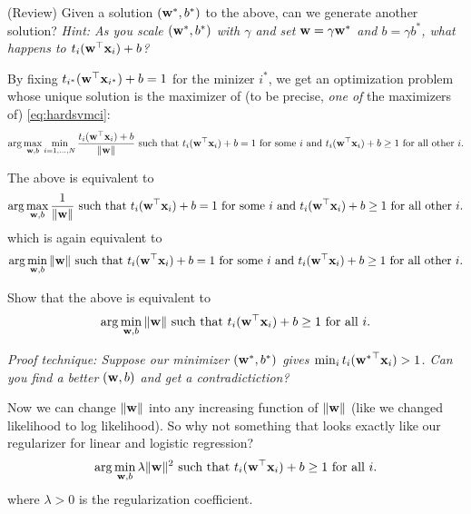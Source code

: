 \documentclass{discussion}
\begin{document}
\begin{exercise}(Review) Given a solution $(\mathbf{w}^*,b^*)$ to the above, can we generate another solution? 
\emph{Hint: As you scale $(\mathbf{w}^*,b^*)$ with $\gamma$ and set $\mathbf{w} = \gamma\mathbf{w}^*$ and $b = \gamma b^*$, what happens to $t_i (\mathbf{w}^\top \mathbf{x}_i) + b$?}
\end{exercise}

By fixing $t_{i^*} (\mathbf{w}^\top \mathbf{x}_{i^*}) + b = 1$ for the minizer $i^*$, we get an optimization problem whose unique solution is the maximizer of (to be precise, \emph{one of} the maximizers of) \eqref{eq:hardsvmci}:
\begin{equation}
    \arg\max_{\mathbf{w}, b} \min_{i = 1,\ldots, N} \frac{t_{i} (\mathbf{w}^\top \mathbf{x}_{i}) + b}{\|\mathbf{w}\|}  \ \text{such that $t_{i} (\mathbf{w}^\top \mathbf{x}_{i}) + b = 1$ for some $i$ and $t_{i} (\mathbf{w}^\top \mathbf{x}_{i}) + b \geq 1$ for all other $i$.}
\end{equation}

The above is equivalent to 
\begin{equation}
    \arg\max_{\mathbf{w}, b} \frac{1}{\|\mathbf{w}\|}  \ \text{such that $t_{i} (\mathbf{w}^\top \mathbf{x}_{i}) + b = 1$ for some $i$ and $t_{i} (\mathbf{w}^\top \mathbf{x}_{i}) + b \geq 1$ for all other $i$.}
\end{equation}
which is again equivalent to 
\begin{equation}
    \arg\min_{\mathbf{w}, b} \|\mathbf{w}\|  \ \text{such that $\ci = 1$ for some $i$ and $\ci \geq 1$ for all other $i$.}
\end{equation}

\begin{exercise}
Show that the above is equivalent to
\begin{equation}
\label{eq:hardsvm_primal}
    \arg\min_{\mathbf{w}, b} \|\mathbf{w}\|  \ \text{such that $t_{i} (\mathbf{w}^\top \mathbf{x}_{i}) + b \geq 1$ for all $i$.}
\end{equation}

\emph{Proof technique: Suppose our minimizer $(\mathbf{w}^*, b^*)$ gives $\min_i t_i({\mathbf{w}^*}^\top \mathbf{x}_i) > 1$. Can you find a better $(\mathbf{w}, b)$ and get a contradictiction?}
\end{exercise}

Now we can change $\|\mathbf{w}\|$ into any increasing function of $\|\mathbf{w}\|$ (like we changed likelihood to log likelihood). So why not something that looks exactly like our regularizer for linear and logistic regression?
\begin{equation}
    \arg\min_{\mathbf{w}, b} \lambda\|\mathbf{w}\|^2  \ \text{such that $t_{i} (\mathbf{w}^\top \mathbf{x}_{i}) + b \geq 1$ for all $i$.}
\end{equation}
where $\lambda >0 $ is the regularization coefficient.
\end{document}
